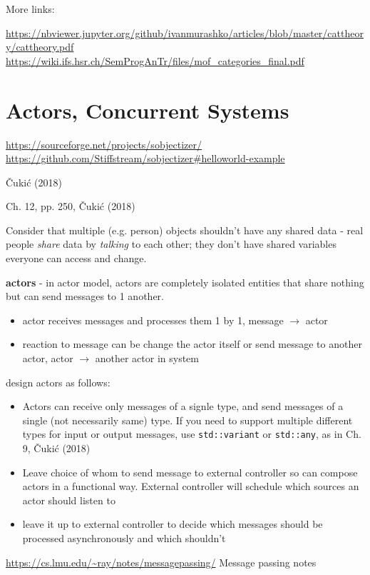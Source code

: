 \documentclass[10pt]{amsart}
\begin{document}
\begin{multicols*}{2}
More links:

\url{https://nbviewer.jupyter.org/github/ivanmurashko/articles/blob/master/cattheory/cattheory.pdf}
\url{https://wiki.ifs.hsr.ch/SemProgAnTr/files/mof_categories_final.pdf}

\section{Actors, Concurrent Systems}

\url{https://sourceforge.net/projects/sobjectizer/}
\url{https://github.com/Stiffstream/sobjectizer#helloworld-example}

\v{C}uki\'{c} (2018) \cite{Cuki2018}

Ch. 12, pp. 250, \v{C}uki\'{c} (2018) \cite{Cuki2018}

Consider that multiple (e.g. person) objects shouldn't have any shared data - real people \emph{share} data by \emph{talking} to each other; they don't have shared variables everyone can access and change.

\textbf{actors} - in actor model, actors are completely isolated entities that share nothing but can send messages to 1 another.
\begin{itemize}
	\item actor receives messages and processes them 1 by 1, message $\to$ actor
	\item reaction to message can be change the actor itself or send message to another actor, actor $\to $ another actor in system
\end{itemize}

design actors as follows:

\begin{itemize}
	\item Actors can receive only messages of a signle type, and send messages of a single (not necessarily same) type. If you need to support multiple different types for input or output messages, use \verb|std::variant| or \verb|std::any|, as in Ch. 9, \v{C}uki\'{c} (2018) \cite{Cuki2008}
	\item Leave choice of whom to send message to external controller so can compose actors in a functional way. External controller will schedule which sources an actor should listen to
	\item leave it up to external controller to decide which messages should be processed asynchronously and which shouldn't
\end{itemize}

\url{https://cs.lmu.edu/~ray/notes/messagepassing/} Message passing notes
	

\end{multicols*}
\end{document}

